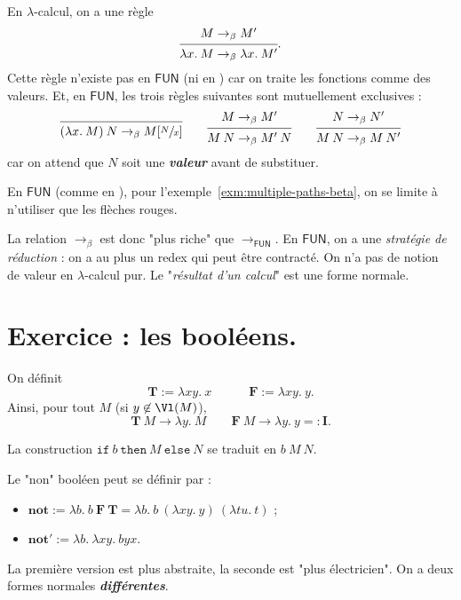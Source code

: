 \documentclass[./main]{subfiles}
\begin{document}
  En $\lambda$-calcul, on a une règle 
  \[
    \begin{prooftree}
      \hypo{M \to_\beta M'}
      \infer 1{\lambda x.\: M \to_\beta \lambda x.\: M'}
    \end{prooftree}
  .\] 
  Cette règle n'existe pas en $\mathsf{FUN}$ (ni en \fouine) car on traite les fonctions comme des valeurs.
  Et, en $\mathsf{FUN}$, les trois règles suivantes sont mutuellement exclusives :
  \begin{gather*}
    \begin{prooftree}
      \infer 0{(\lambda x.\: M)\: N \to_\beta M[\sfrac{N}{x}]}
    \end{prooftree}
    \quad\quad
    \begin{prooftree}
      \hypo{M \to_\beta M'}
      \infer 1{M \: N \to_\beta M' \: N}
    \end{prooftree}
    \quad\quad
    \begin{prooftree}
      \hypo{N \to_\beta N'}
      \infer 1{M \: N \to_\beta M \: N'}
    \end{prooftree}
  \end{gather*}
  car on attend que $N$ soit une \textit{\textbf{valeur}} avant de substituer.

  En $\mathsf{FUN}$ (comme en \fouine), pour l'exemple~\ref{exm:multiple-paths-beta}, on se limite à n'utiliser que les flèches rouges.

  La relation $\to_\beta$ est donc "plus riche" que $\to_\mathsf{FUN}$.
  En $\mathsf{FUN}$, on a une \textit{stratégie de réduction} : on a au plus un redex qui peut être contracté.
  On n'a pas de notion de valeur en $\lambda$-calcul pur. Le "\textit{résultat d'un calcul}" est une forme normale.

  \section{Exercice : les booléens.}
  On définit \[
  \mathbf{T} := \lambda x y. \: x \quad\quad\quad \mathbf{F} := \lambda xy. \: y
  .\]
  Ainsi, pour tout $M$ (si $y \not\in \Vl(M)$), \[
  \mathbf{T}\: M \to \lambda y.\: M \quad\quad \mathbf{F} \: M \to \lambda y. \: y =: \mathbf{I}
  .\]

  La construction $\mathtt{if}\ b\ \mathtt{then}\ M\ \mathtt{else}\ N$ se traduit en $b \: M \: N$.

  Le "non" booléen peut se définir par :
  \begin{itemize}
    \item $\mathbf{not} := \lambda b. \: b \: \mathbf{F}\: \mathbf{T} = \lambda b.\: b\: (\lambda x y.\: y) \: (\lambda t u.\: t)$ ;
    \item $\mathbf{not}' := \lambda b.\: \lambda x y.\: b y x$.
  \end{itemize}
  La première version est plus abstraite, la seconde est "plus électricien".
  On a deux formes normales \textit{\textbf{différentes}}.
\end{document}
